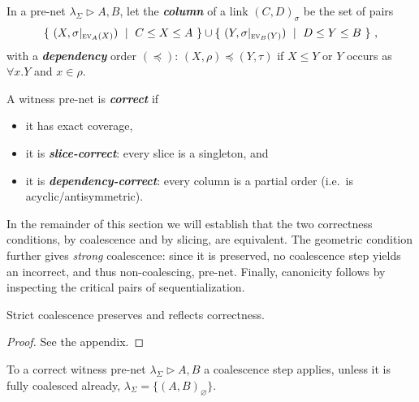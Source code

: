 \documentclass[UKenglish]{lipics-v2016}
\theoremstyle{plain}
\newcommand\defn[1]{\textit{\textbf{#1}}}
\newcommand\ex[2][{}]{\textsc{ev}_{#1}(#2)}
\newcommand\+{+}
\renewcommand\*{\times}
\newcommand\sub{\leq}
\newcommand\dep{\preccurlyeq}
\newcommand\net[3]{#1\triangleright #2,#3}
\newcommand\res[1]{|_{#1}}
\newcommand\link[3][\sigma]{(#2,#3)_{#1}}
\begin{document}
\begin{definition}
In a pre-net $\net{\lambda_\Sigma}AB$, let the \defn{column} of a link $\link CD$ be the set of pairs 
\[
	\{~(X,\sigma\res{\ex[A]X})~\mid~C\sub X\sub A~\}\cup\{~(Y,\sigma\res{\ex[B]Y})~\mid~D\sub Y\sub B~\}~,
\]
with a \defn{dependency} order $(\dep)$: $(X,\rho)\dep(Y,\tau)$ if $X\leq Y$ or $Y$ occurs as $\forall x.Y$ and $x\in\rho$.
\end{definition}

\begin{definition}
A witness pre-net is \defn{correct} if
\begin{itemize}
\item it has exact coverage,
\item it is \defn{slice-correct}: every slice is a singleton, and
\item it is \defn{dependency-correct}: every column is a partial order (i.e.\ is acyclic/antisymmetric).
\end{itemize}
\end{definition}

In the remainder of this section we will establish that the two correctness conditions, by coalescence and by slicing, are equivalent. The geometric condition further gives \emph{strong} coalescence: since it is preserved, no coalescence step yields an incorrect, and thus non-coalescing, pre-net. Finally, canonicity follows by inspecting the critical pairs of sequentialization.

\setcounter{lemcorrect}{\thetheorem}
\begin{lemma}
\label{lem:correct}
Strict coalescence preserves and reflects correctness.
\end{lemma}

\begin{proof}
See the appendix.
\end{proof}


\setcounter{lemcoalescenceapplies}{\thetheorem}
\begin{lemma}
\label{lem:coalescence applies}
To a correct witness pre-net $\net{\lambda_\Sigma}AB$ a coalescence step applies, unless it is fully coalesced already, $\lambda_\Sigma=\{\link[\varnothing]AB\}$.
\end{lemma}
\end{document}
